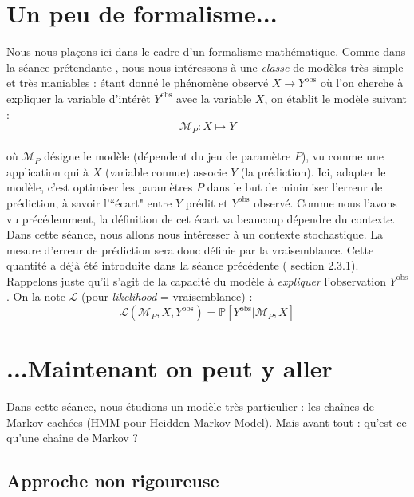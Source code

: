 \documentclass[english]{article}
\begin{document}
\section{Un peu de formalisme...}
Nous nous plaçons ici dans le cadre d'un formalisme mathématique. Comme dans la séance prétendante \cite{1}, nous nous intéressons à une \textit{classe} de modèles très simple et très maniables : étant donné le phénomène observé $X\rightarrow Y^{\text{obs}}$ où l'on cherche à expliquer la variable d'intérêt $Y^{\text{obs}}$ avec la variable $X$, on établit le modèle suivant :
\[\mathcal{M}_P:X \mapsto Y\]
\\
où $\mathcal{M}_P$ désigne le modèle (dépendent du jeu de paramètre $P$), vu comme une application qui à $X$ (variable connue) associe $Y$ (la prédiction). Ici, adapter le modèle, c'est optimiser les paramètres $P$ dans le but de minimiser l'erreur de prédiction, à savoir l'``écart" entre $Y$ prédit et $Y^{\text{obs}}$ observé. Comme nous l'avons vu précédemment, la définition de cet écart va beaucoup dépendre du contexte. Dans cette séance, nous allons nous intéresser à un contexte stochastique. La mesure d'erreur de prédiction sera donc définie par la vraisemblance. Cette quantité a déjà été introduite dans la séance précédente (\cite{1} section 2.3.1). Rappelons juste qu'il s'agit de la capacité du modèle à \textit{expliquer} l'observation $Y^{\text{obs}}$. On la note $\mathcal{L}$ (pour \textit{likelihood} = vraisemblance) :
\[\mathcal{L}(\mathcal{M}_P,X,Y^{\text{obs}}) = \mathbb{P}[Y^{\text{obs}}\vert \mathcal{M}_P,X]\]

\section{ ...Maintenant on peut y aller}

Dans cette séance, nous étudions un modèle très particulier : les cha\^ines de Markov cachées (HMM pour Heidden Markov Model). Mais avant tout : qu'est-ce qu'une chaîne de Markov ?

\subsection{Approche non rigoureuse}
\end{document}
